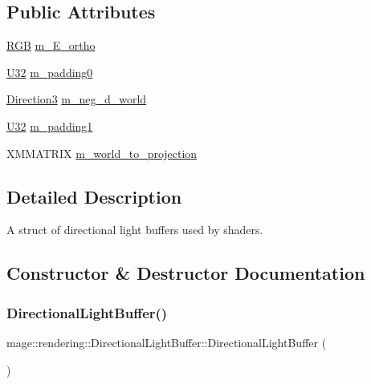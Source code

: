 \subsection*{Public Attributes}
\begin{DoxyCompactItemize}
\item 
\mbox{\hyperlink{structmage_1_1_r_g_b}{R\+GB}} \mbox{\hyperlink{structmage_1_1rendering_1_1_directional_light_buffer_a95dfc58f116bfa54ab2a9b812bc9d5e3}{m\+\_\+\+E\+\_\+ortho}}
\item 
\mbox{\hyperlink{namespacemage_aa5d6eaabaac3cdd01873d6a3d27e90f3}{U32}} \mbox{\hyperlink{structmage_1_1rendering_1_1_directional_light_buffer_a82d9a78edf5562c3ce041d1a2a7b6a3e}{m\+\_\+padding0}}
\item 
\mbox{\hyperlink{structmage_1_1_direction3}{Direction3}} \mbox{\hyperlink{structmage_1_1rendering_1_1_directional_light_buffer_a44ae081673f5dde10e305a20581e31ef}{m\+\_\+neg\+\_\+d\+\_\+world}}
\item 
\mbox{\hyperlink{namespacemage_aa5d6eaabaac3cdd01873d6a3d27e90f3}{U32}} \mbox{\hyperlink{structmage_1_1rendering_1_1_directional_light_buffer_a9e86dcc4f68340eb64408cf638996a69}{m\+\_\+padding1}}
\item 
X\+M\+M\+A\+T\+R\+IX \mbox{\hyperlink{structmage_1_1rendering_1_1_directional_light_buffer_ae1c5a43c5dca80be889661a54fb3910b}{m\+\_\+world\+\_\+to\+\_\+projection}}
\end{DoxyCompactItemize}


\subsection{Detailed Description}
A struct of directional light buffers used by shaders. 

\subsection{Constructor \& Destructor Documentation}
\mbox{\label{structmage_1_1rendering_1_1_directional_light_buffer_a618dbd63423f0f008ef18c5e5a7fe560}} 
\subsubsection{\texorpdfstring{Directional\+Light\+Buffer()}{DirectionalLightBuffer()}\hspace{0.1cm}{\footnotesize\ttfamily [1/3]}}
{\footnotesize\ttfamily mage\+::rendering\+::\+Directional\+Light\+Buffer\+::\+Directional\+Light\+Buffer (\begin{DoxyParamCaption}{ }\end{DoxyParamCaption})\hspace{0.3cm}{\ttfamily [noexcept]}}

